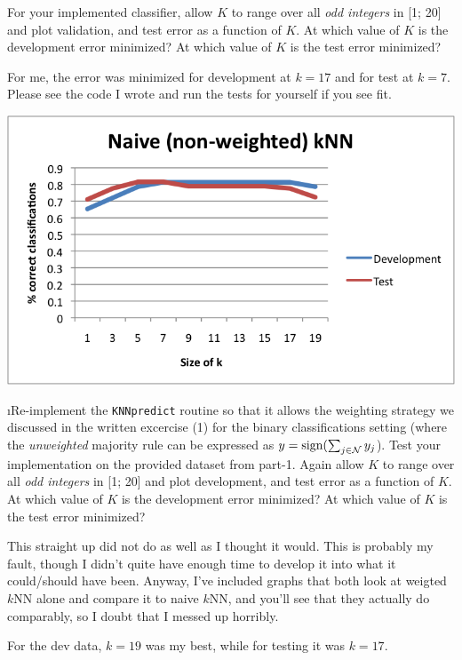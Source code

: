 \documentclass[fleqn]{article}
\begin{document}
For your implemented classifier, allow $K$ to range over all \textit{odd integers} 
in [1; 20] and plot validation, and test error as a function of $K$. At which 
value of $K$ is the development error minimized? At which value of $K$ is the test 
error minimized?

\begin{solution}
For me, the error was minimized for development at $k = 17$ and for test at $k = 7$. Please see the code I wrote and run the tests for yourself if you see fit.

\includegraphics[scale=0.8]{Naive.png}
\end{solution}

\i Re-implement the \texttt{KNNpredict} routine so that it allows the weighting strategy 
we discussed in the written excercise (1) for the binary classifications setting
(where the \textit{unweighted} majority rule can be expressed as $y = \textrm{sign}(\sum_{j 
\in \mathcal{N}} y_j$). Test your implementation on the provided dataset from part-1. 
Again allow $K$ to range over all \textit{odd integers} in [1; 20] and plot development, 
and test error as a function of $K$. At which value of $K$ is the development error 
minimized? At which value of $K$ is the test error minimized?

\begin{solution}
This straight up did not do as well as I thought it would. This is probably my fault, though I didn't quite have enough time to develop it into what it could/should have been. Anyway, I've included graphs that both look at weigted $k$NN alone and compare it to naive $k$NN, and you'll see that they actually do comparably, so I doubt that I messed up horribly.

For the dev data, $k = 19$ was my best, while for testing it was $k = 17$.
\end{solution}
\end{document}
